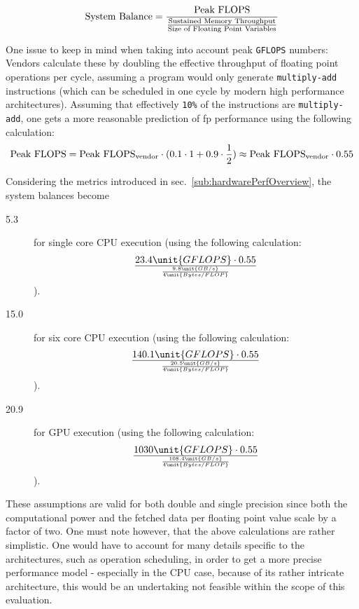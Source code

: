 \begin{equation}
    \text{System Balance} = {\text{Peak FLOPS} \over {\text{Sustained Memory Throughput}\over\text{Size of Floating Point Variables}}}
\end{equation}

One issue to keep in mind when taking into account peak \verb|GFLOPS| numbers: Vendors calculate these by doubling the effective throughput of floating point operations per cycle, assuming a program would only generate \verb|multiply-add| instructions (which can be scheduled in one cycle by modern high performance architectures). Assuming that effectively \verb|10%| of the instructions are \verb|multiply-add|, one gets a more reasonable prediction of fp performance using the following calculation:
\begin{equation}
  \text{Peak FLOPS} = {\text{Peak FLOPS}_{\text{vendor}} \cdot (0.1 \cdot 1 + 0.9 \cdot {1 \over 2})} \approx {\text{Peak FLOPS}_{\text{vendor}} \cdot 0.55}
\end{equation}

Considering the metrics introduced in sec.~\ref{sub:hardwarePerfOverview}, the system balances become 
\begin{description}
 \item[5.3] for single core CPU execution (using the following calculation: 
  \begin{equation}
    23.4 \unit{GFLOPS} \cdot 0.55 \over{ 9.8 \unit{GB/s} \over{ 4 \unit{Bytes/FLOP}}}
  \end{equation} 
 ).
 \item[15.0] for six core CPU execution (using the following calculation:
  \begin{equation}
    140.1 \unit{GFLOPS} \cdot 0.55 \over{ 20.5 \unit{GB/s} \over{ 4 \unit{Bytes/FLOP}}}
  \end{equation}
 ).
 \item[20.9] for GPU execution (using the following calculation: 
  \begin{equation}
    1030 \unit{GFLOPS} \cdot 0.55 \over{ 108.4 \unit{GB/s} \over {4 \unit{Bytes/FLOP}}}
  \end{equation}
 ).
\end{description}
These assumptions are valid for both double and single precision since both the computational power and the fetched data per floating point value scale by a factor of two. One must note however, that the above calculations are rather simplistic. One would have to account for many details specific to the architectures, such as operation scheduling, in order to get a more precise performance model - especially in the CPU case, because of its rather intricate architecture, this would be an undertaking not feasible within the scope of this evaluation. 

